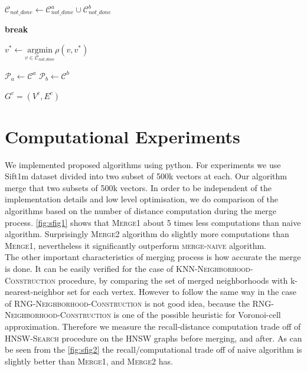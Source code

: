 \documentclass{article}
\begin{document}
\begin{algorithm}
\begin{algorithmic}[1]
        
        \State $\mathcal{C}_{not\_done} \gets \mathcal{C}^a_{not\_done} \cup \mathcal{C}^b_{not\_done}$
        
            \State \textbf{break}
        \EndIf
        
        \State $v^* \gets \underset{v \in \mathcal{C}_{not\_done}}{\mathrm{argmin}} \rho(v, v^*)$
        
        \State $\mathcal{P}_a \gets \mathcal{C}^a$
        \State $\mathcal{P}_b \gets \mathcal{C}^b$
    \EndWhile
\EndWhile

\State \Return $G^c=(V^c,E^c)$


\end{algorithmic}
\end{algorithm}

\section{Computational Experiments}
We implemented proposed algorithms using python. For experiments we use Sift1m dataset divided into two subset of 500k vectors at each. Our algorithm merge that two subsets of 500k vectors. In order to be independent of the implementation details and low level optimisation, we do comparison of the algorithms based on the number of distance computation during the merge process. \ref{fig:sfig1} shows that \textsc{Merge1} about 5 times less computations than naive algorithm. Surprisingly \textsc{Merge2} algorithm do slightly more computations than \textsc{Merge1}, nevertheless it significantly outperform \textsc{merge-naive} algorithm.\\
The other important characteristics of merging process is how accurate the merge is done. It can be easily verified for the case of \textsc{KNN-Neighborhood-Construction} procedure, by comparing the set of merged neighborhoods with k-nearest-neighbor set for each vertex. However to follow the same way in the case of \textsc{RNG-Neighborhood-Construction} is not good idea, because the \textsc{RNG-Neighborhood-Construction} is one of the possible heuristic for Voronoi-cell approximation. Therefore we measure the recall-distance computation trade off of \textsc{HNSW-Search} procedure on the HNSW graphs before merging, and after. As can be seen from the \ref{fig:sfig2} the recall/computational trade off of naive algorithm is slightly better than  \textsc{Merge1}, and  \textsc{Merge2} has. 
\end{document}
